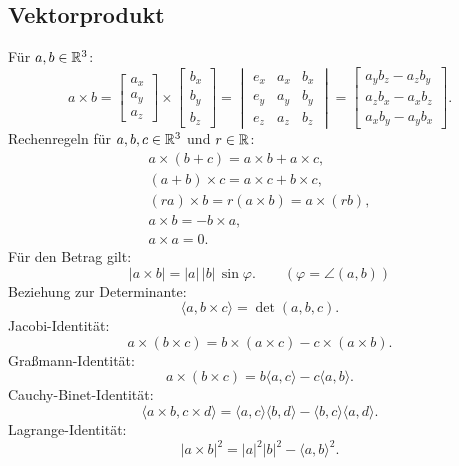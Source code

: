 \subsection{Vektorprodukt}
Für $a,b\in\mathbb R^3$:
\begin{equation}
a\times b = \begin{bmatrix}
a_x\\ a_y\\ a_z
\end{bmatrix}\times\begin{bmatrix}
b_x\\ b_y\\ b_z
\end{bmatrix}
= \begin{vmatrix}
e_x & a_x & b_x\\
e_y & a_y & b_y\\
e_z & a_z & b_z
\end{vmatrix}
= \begin{bmatrix}
a_y b_z - a_z b_y\\
a_z b_x - a_x b_z\\
a_x b_y - a_y b_x
\end{bmatrix}.
\end{equation}
Rechenregeln für $a,b,c\in\mathbb R^3$ und $r\in\mathbb R$:
\begin{gather}
a\times (b+c) = a\times b+a\times c,\\
(a+b)\times c = a\times c+b\times c,\\
(ra)\times b = r(a\times b) = a\times(rb),\\
a\times b = -b\times a,\\
a\times a = 0.
\end{gather}
Für den Betrag gilt:
\begin{equation}
|a\times b| = |a|\,|b|\,\sin\varphi.\qquad(\varphi=\angle (a,b))
\end{equation}
Beziehung zur Determinante:
\begin{equation}
\langle a,b\times c\rangle = \det(a,b,c).
\end{equation}
Jacobi-Identität:%
\begin{equation}
a\times(b\times c) = b\times (a\times c) - c\times (a\times b). 
\end{equation}
Graßmann-Identität:%
\begin{equation}
a\times(b\times c) = b\langle a,c\rangle - c\langle a,b\rangle.
\end{equation}
Cauchy-Binet-Identität:
\begin{equation}
\langle a\times b, c\times d\rangle
= \langle a,c\rangle\langle b,d\rangle
- \langle b,c\rangle\langle a,d\rangle.
\end{equation}
Lagrange-Identität:%
\begin{equation}
|a\times b|^2 = |a|^2 |b|^2 - \langle a,b\rangle^2.
\end{equation}

